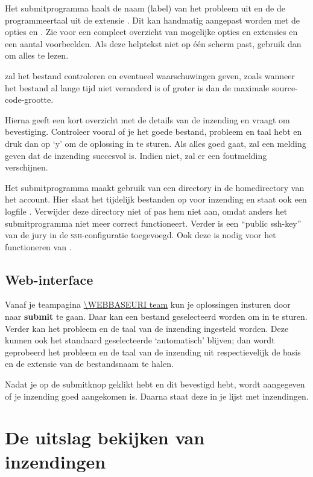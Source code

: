 Het submitprogramma haalt de naam (label) van het probleem uit
 en de de programmeertaal uit de extensie
. Dit kan handmatig aangepast worden met de opties
 en . Zie
 voor een compleet overzicht van mogelijke
opties en extensies en een aantal voorbeelden. Als deze
helptekst niet op \'e\'en scherm past, gebruik dan
 om alles te lezen.

 zal het bestand controleren en eventueel
waarschuwingen geven, zoals wanneer het bestand al lange tijd niet
veranderd is of groter is dan de maximale source-code-grootte.

Hierna geeft  een kort overzicht met de details van de
inzending en vraagt om bevestiging. Controleer vooral of je het goede
bestand, probleem en taal hebt en druk dan op `y' om de oplossing in
te sturen. Als alles goed gaat, zal  een melding geven
dat de inzending succesvol is. Indien niet, zal er een foutmelding
verschijnen.

Het submitprogramma maakt gebruik van een directory \cmd{\USERSUBMITDIR}
in de homedirectory van het account. Hier slaat het tijdelijk
bestanden op voor inzending en staat ook een logfile .
Verwijder deze directory niet of pas hem niet aan, omdat anders het
submitprogramma niet meer correct functioneert. Verder is een
``public ssh-key'' van de jury in de \textsc{ssh}-configuratie
toegevoegd. Ook deze is nodig voor het functioneren van .

\subsection{Web-interface}

Vanaf je teampagina \url{\WEBBASEURI team} kun je oplossingen insturen
door naar \textbf{submit} te gaan. Daar kan een bestand
geselecteerd worden om in te sturen. Verder kan het probleem en de
taal van de inzending ingesteld worden. Deze kunnen ook het
standaard geselecteerde `automatisch' blijven; dan wordt
geprobeerd het probleem en de taal van de inzending uit
respectievelijk de basis en de extensie van de bestandsnaam te halen.

Nadat je op de submitknop geklikt hebt en dit bevestigd hebt, wordt
aangegeven of je inzending goed aangekomen is. Daarna staat deze in je
lijst met inzendingen.

\section{De uitslag bekijken van inzendingen}

